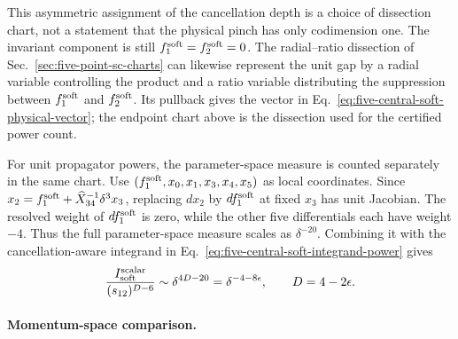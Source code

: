 \documentclass[a4paper,11pt]{article}
\begin{document}
This asymmetric assignment of the cancellation depth is a choice of
dissection chart, not a statement that the physical pinch has only
codimension one.  The invariant component is still
\(f_1^{\rm soft}=f_2^{\rm soft}=0\).  The radial--ratio dissection of
Sec.~\ref{sec:five-point-sc-charts} can likewise represent the unit gap by a
radial variable controlling the product and a ratio variable distributing the
suppression between \(f_1^{\rm soft}\) and \(f_2^{\rm soft}\).  Its
pullback gives the vector in
Eq.~\eqref{eq:five-central-soft-physical-vector}; the endpoint chart above is
the dissection used for the certified power count.

For unit propagator powers, the parameter-space measure is counted separately
in the same chart.  Use
\((f_1^{\rm soft},x_0,x_1,x_3,x_4,x_5)\) as local coordinates.  Since
\(x_2=f_1^{\rm soft}+\widehat X_{34}^{-1}\delta^3x_3\), replacing
\(dx_2\) by \(df_1^{\rm soft}\) at fixed \(x_3\) has unit Jacobian.  The
resolved weight of \(df_1^{\rm soft}\) is zero, while the other five
differentials each have weight \(-4\).  Thus the full parameter-space measure
scales as \(\delta^{-20}\).  Combining it with the cancellation-aware
integrand in Eq.~\eqref{eq:five-central-soft-integrand-power} gives
\begin{equation}
 \frac{I_{\rm soft}^{\rm scalar}}{(s_{12})^{D-6}}
 \sim\delta^{4D-20}=\delta^{-4-8\epsilon},
 \qquad D=4-2\epsilon.
\label{eq:five-central-soft-parameter-power}
\end{equation}

\paragraph{Momentum-space comparison.}
\end{document}
